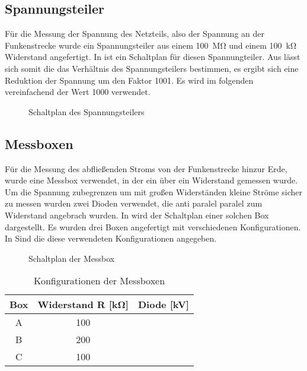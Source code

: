 \subsection{Spannungsteiler}
\label{sec:voltage_divider}
Für die Messung der Spannung des Netzteils, also der Spannung an der Funkenstrecke wurde ein Spannungsteiler aus einem \SI{100}{\mega\ohm} und einem \SI{100}{\kilo\ohm} Widerstand angefertigt. In  ist ein Schaltplan für diesen Spannungteiler. Aus  lässt sich somit die das Verhältnis des Spannungsteilers bestimmen, es ergibt sich eine Reduktion der Spannung um den Faktor 1001. Es wird im folgenden vereinfachend der Wert 1000 verwendet.

\begin{figure}[H]
    \centering
    \resizebox{0.5\textwidth}{!}{%
        
    }
    \caption{Schaltplan des Spannungsteilers}
    \label{fig:setup_voltage_divider}
\end{figure}


\subsection{Messboxen}
\label{sec:messbox}
Für die Messung des abfließenden Stroms von der Funkenstrecke hinzur Erde, wurde eine Messbox verwendet, in der ein über ein Widerstand gemessen wurde. Um die Spannung zubegrenzen um mit großen Widerständen kleine Ströme sicher zu messen wurden zwei Dioden verwendet, die anti paralel paralel zum Widerstand angebrach wurden. In  wird der Schaltplan einer solchen Box dargestellt. Es wurden drei Boxen angefertigt mit verschiedenen Konfigurationen. In  Sind die diese verwendeten Konfigurationen angegeben.

\begin{figure}[H]
    \centering
    \resizebox{0.5\textwidth}{!}{%
        
    }
    \caption{Schaltplan der Messbox}
    \label{fig:setup_box}
\end{figure}

\begin{table}[H]
\centering
\caption{Konfigurationen der Messboxen}
\label{tab:boxsetup}
\begin{tabular}{S[table-format=2.0] S[table-format=2.1] S[table-format=2.1]}
\toprule
\textbf{Box} & \textbf{Widerstand R [\si{\kilo\ohm}]} & \textbf{Diode [\si{\kilo\volt}]}\\
\midrule
A  & 100 &  \\
B  & 200 & \\
C  & 100 & \\
\bottomrule
\end{tabular}
\end{table}


